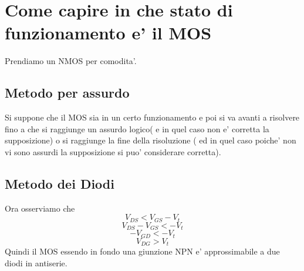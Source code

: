 \documentclass[\main/main.tex]{subfiles}
\begin{document}
\begin{figure}[H]
\center
{}
\end{figure}

\clearpage
\section{Come capire in che stato di funzionamento e' il MOS}
Prendiamo un NMOS per comodita'.

\subsection{Metodo per assurdo}

Si suppone che il MOS sia in un certo funzionamento e poi si va avanti a risolvere fino a che si raggiunge un assurdo logico( e in quel caso non e' corretta la supposizione) o si raggiunge la fine della risoluzione ( ed in quel caso poiche' non vi sono assurdi la supposizione si puo' considerare corretta).

\subsection{Metodo dei Diodi}

Ora osserviamo che
\[V_{DS} < V_{GS} - V_t\]
\[V_{DS} - V_{GS} <  - V_t\]
\[-V_{GD} <  - V_t\]
\[V_{DG} > V_t\]
Quindi il MOS essendo in fondo una giunzione NPN e' approssimabile a due diodi in antiserie.
\end{document}
